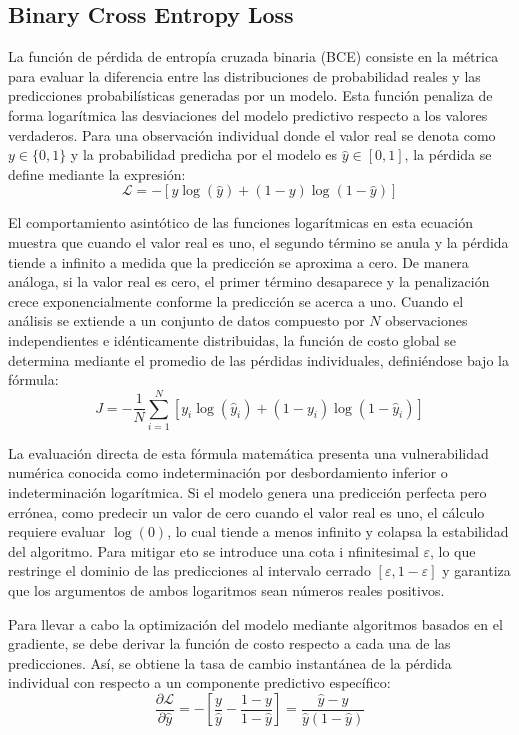 \documentclass[12pt]{article}
\begin{document}
\subsection{Binary Cross Entropy Loss}

La función de pérdida de entropía cruzada binaria (BCE) consiste en la métrica para 
evaluar la diferencia entre las distribuciones de probabilidad reales y las predicciones 
probabilísticas generadas por un modelo. Esta función penaliza de forma logarítmica las 
desviaciones del modelo predictivo respecto a los valores verdaderos. Para una observación 
individual donde el valor real se denota como $y \in \{0, 1\}$ y la probabilidad predicha 
por el modelo es $\hat{y} \in [0, 1]$, la pérdida se define mediante la expresión:
\[
\mathcal{L} = - \left[ y \log(\hat{y}) + (1 - y) \log(1 - \hat{y}) \right]
\]

El comportamiento asintótico de las funciones logarítmicas en esta ecuación muestra que
cuando el valor real es uno, el segundo término se anula y la pérdida tiende a infinito 
a medida que la predicción se aproxima a cero. De manera análoga, si la valor real es cero, 
el primer término desaparece y la penalización crece exponencialmente conforme la predicción 
se acerca a uno. Cuando el análisis se extiende a un conjunto de datos compuesto por $N$ 
observaciones independientes e idénticamente distribuidas, la función de costo global se 
determina mediante el promedio de las pérdidas individuales, definiéndose bajo la fórmula:
\[
J = -\frac{1}{N} \sum_{i=1}^{N} \left[ y_i \log(\hat{y}_i) + (1 - y_i) \log(1 - \hat{y}_i) \right]
\]

La evaluación directa de esta fórmula matemática presenta una vulnerabilidad numérica 
conocida como indeterminación por desbordamiento inferior o indeterminación logarítmica. 
Si el modelo genera una predicción perfecta pero errónea, como predecir un valor de cero 
cuando el valor real es uno, el cálculo requiere evaluar $\log(0)$, lo cual tiende a menos 
infinito y colapsa la estabilidad del algoritmo. Para mitigar eto se introduce una cota i
nfinitesimal $\varepsilon$, lo que restringe el dominio de las predicciones al intervalo 
cerrado $[\varepsilon, 1 - \varepsilon]$ y garantiza que los argumentos de ambos logaritmos 
sean números reales positivos.

Para llevar a cabo la optimización del modelo mediante algoritmos basados en el gradiente, 
se debe derivar la función de costo respecto a cada una de las predicciones. Así, se obtiene la 
tasa de cambio instantánea de la pérdida individual con respecto a un componente predictivo 
específico:
\[
\frac{\partial \mathcal{L}}{\partial \hat{y}} = - \left[ \frac{y}{\hat{y}} - \frac{1 - y}{1 - \hat{y}} \right] = \frac{\hat{y} - y}{\hat{y}(1 - \hat{y})}
\]
\end{document}
